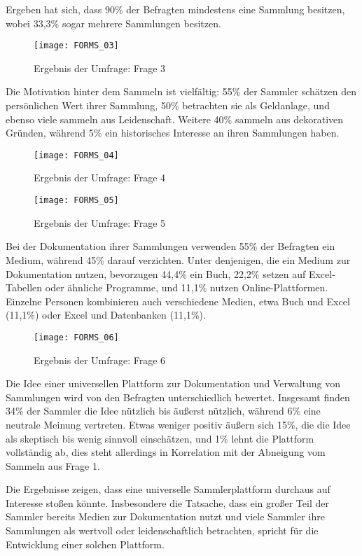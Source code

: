 Ergeben hat sich, dass 90\% der Befragten mindestens eine Sammlung besitzen, wobei 33,3\% sogar mehrere Sammlungen besitzen.

\begin{figure}[h!]
    \centering
    \texttt{[image: FORMS\_03]}
    \caption{Ergebnis der Umfrage: Frage 3}
    \label{fig:forms_result_03}
\end{figure}

Die Motivation hinter dem Sammeln ist vielfältig: 55\% der Sammler schätzen den persönlichen Wert ihrer Sammlung, 50\% betrachten sie als Geldanlage, und ebenso viele sammeln aus Leidenschaft.
Weitere 40\% sammeln aus dekorativen Gründen, während 5\% ein historisches Interesse an ihren Sammlungen haben. \par

\begin{figure}[h!]
    \centering
    \texttt{[image: FORMS\_04]}
    \caption{Ergebnis der Umfrage: Frage 4}
    \label{fig:forms_result_04}
\end{figure}
\begin{figure}[h!]
    \centering
    \texttt{[image: FORMS\_05]}
    \caption{Ergebnis der Umfrage: Frage 5}
    \label{fig:forms_result_05}
\end{figure}
Bei der Dokumentation ihrer Sammlungen verwenden 55\% der Befragten ein Medium, während 45\% darauf verzichten.
Unter denjenigen, die ein Medium zur Dokumentation nutzen, bevorzugen 44,4\% ein Buch, 22,2\% setzen auf Excel-Tabellen oder ähnliche Programme, und 11,1\% nutzen Online-Plattformen.
Einzelne Personen kombinieren auch verschiedene Medien, etwa Buch und Excel (11,1\%) oder Excel und Datenbanken (11,1\%).\par

\begin{figure}[h!]
    \centering
    \texttt{[image: FORMS\_06]}
    \caption{Ergebnis der Umfrage: Frage 6}
    \label{fig:forms_result_06}
\end{figure}
Die Idee einer universellen Plattform zur Dokumentation und Verwaltung von Sammlungen wird von den Befragten unterschiedlich bewertet.
Insgesamt finden 34\% der Sammler die Idee nützlich bis äußerst nützlich, während 6\% eine neutrale Meinung vertreten.
Etwas weniger positiv äußern sich 15\%, die die Idee als skeptisch bis wenig sinnvoll einschätzen, und 1\% lehnt die Plattform vollständig ab, dies steht allerdings in Korrelation mit der Abneigung vom Sammeln aus Frage 1.\par

Die Ergebnisse zeigen, dass eine universelle Sammlerplattform durchaus auf Interesse stoßen könnte.
Insbesondere die Tatsache, dass ein großer Teil der Sammler bereits Medien zur Dokumentation nutzt und viele Sammler ihre Sammlungen als wertvoll oder leidenschaftlich betrachten, spricht für die Entwicklung einer solchen Plattform. \par